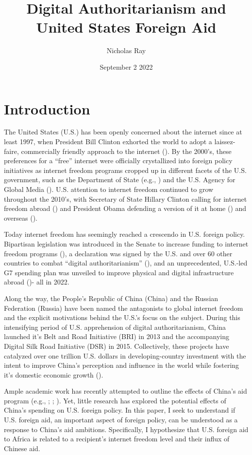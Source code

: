\documentclass{article}
\title{\vspace{-2cm}Digital Authoritarianism and United States Foreign Aid\vspace{-0.5cm}}
\author{Nicholas Ray}
\date{\vspace{-0.5cm}September 2 2022\vspace{-1cm}}
\begin{document}
\maketitle
\section*{Introduction}
The United States (U.S.) has been openly concerned about the internet since at least 1997, when President Bill Clinton exhorted the world to adopt a laissez-faire, commercially friendly approach to the internet (\cite{government1997}). By the 2000's, these preferences for a ``free'' internet were officially crystallized into foreign policy initiatives as internet freedom programs cropped up in different facets of the U.S. government, such as the Department of State (e.g., \cite{government2021}) and the U.S. Agency for Global Media (\cite{government2022d}). U.S. attention to internet freedom continued to grow throughout the 2010's, with Secretary of State Hillary Clinton calling for internet freedom abroad (\cite{government2010}) and President Obama defending a version of it at home (\cite{government2016}) and overseas (\cite{richburg2009}).

Today internet freedom has seemingly reached a crescendo in U.S. foreign policy. Bipartisan legislation was introduced in the Senate to increase funding to internet freedom programs (\cite{government2022a}), a declaration was signed by the U.S. and over 60 other countries to combat ``digital authoritarianism'' (\cite{government2022b}), and an unprecedented, U.S.-led G7 spending plan was unveiled to improve physical and digital infrastructure abroad (\cite{government2022c})- all in 2022. 

Along the way, the People's Republic of China (China) and the Russian Federation (Russia) have been named the antagonists to global internet freedom and the explicit motivations behind the U.S.'s focus on the subject. During this intensifying period of U.S. apprehension of digital authoritarianism, China launched it's Belt and Road Initiative (BRI) in 2013 and the accompanying Digital Silk Road Initiative (DSR) in 2015. Collectively, these projects have catalyzed over one trillion U.S. dollars in developing-country investment with the intent to improve China's perception and influence in the world while fostering it's domestic economic growth (\cite{dreher2022}).

Ample academic work has recently attempted to outline the effects of China's aid program (e.g., \cite{gehring2022}; \cite{dreher2018}; \cite{blair2021}). Yet, little research has explored the potential effects of China's spending on U.S. foreign policy. In this paper, I seek to understand if U.S. foreign aid, an important aspect of foreign policy, can be understood as a response to China's aid ambitions. Specifically, I hypothesize that U.S. foreign aid to Africa is related to a recipient's internet freedom level and their influx of Chinese aid.
\end{document}
